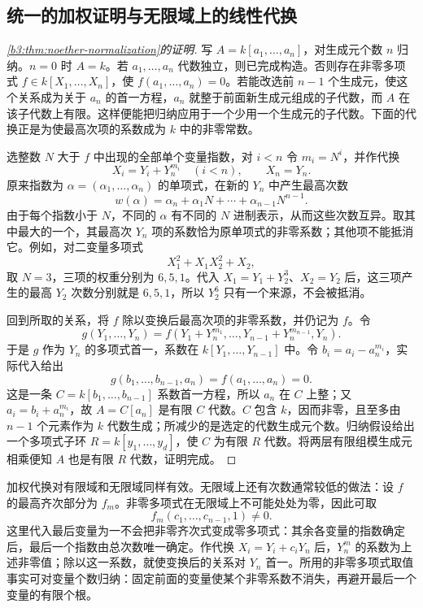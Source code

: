 \subsection{统一的加权证明与无限域上的线性代换}\label{b3:subsec:0504:02}

\begin{proof}[\cref{b3:thm:noether-normalization}的证明]
	写 \(A=k[a_1,\ldots,a_n]\)，对生成元个数 \(n\) 归纳。\(n=0\) 时 \(A=k\)。若 \(a_1,\ldots,a_n\) 代数独立，则已完成构造。否则存在非零多项式 \(f\in k[X_1,\ldots,X_n]\)，使 \(f(a_1,\ldots,a_n)=0\)。若能改选前 \(n-1\) 个生成元，使这个关系成为关于 \(a_n\) 的首一方程，\(a_n\) 就整于前面新生成元组成的子代数，而 \(A\) 在该子代数上有限。这样便能把归纳应用于一个少用一个生成元的子代数。下面的代换正是为使最高次项的系数成为 \(k\) 中的非零常数。

	选整数 \(N\) 大于 \(f\) 中出现的全部单个变量指数，对 \(i<n\) 令 \(m_i=N^i\)，并作代换
	\[
		X_i=Y_i+Y_n^{m_i}\quad(i<n),\qquad X_n=Y_n.
	\]
	原来指数为 \(\alpha=(\alpha_1,\ldots,\alpha_n)\) 的单项式，在新的 \(Y_n\) 中产生最高次数
	\[
		w(\alpha)=\alpha_n+\alpha_1N+\cdots+\alpha_{n-1}N^{n-1}.
	\]
	由于每个指数小于 \(N\)，不同的 \(\alpha\) 有不同的 \(N\) 进制表示，从而这些次数互异。取其中最大的一个，其最高次 \(Y_n\) 项的系数恰为原单项式的非零系数；其他项不能抵消它。例如，对二变量多项式
	\[
		X_1^2+X_1X_2^2+X_2,
	\]
	取 \(N=3\)，三项的权重分别为 \(6,5,1\)。代入 \(X_1=Y_1+Y_2^3\)、\(X_2=Y_2\) 后，这三项产生的最高 \(Y_2\) 次数分别就是 \(6,5,1\)，所以 \(Y_2^6\) 只有一个来源，不会被抵消。

	回到所取的关系，将 \(f\) 除以变换后最高次项的非零系数，并仍记为 \(f\)。令
	\[
		g(Y_1,\ldots,Y_n) =f(Y_1+Y_n^{m_1},\ldots,Y_{n-1}+Y_n^{m_{n-1}},Y_n).
	\]
	于是 \(g\) 作为 \(Y_n\) 的多项式首一，系数在 \(k[Y_1,\ldots,Y_{n-1}]\) 中。令 \(b_i=a_i-a_n^{m_i}\)，实际代入给出
	\[
		g(b_1,\ldots,b_{n-1},a_n)=f(a_1,\ldots,a_n)=0.
	\]
	这是一条 \(C=k[b_1,\ldots,b_{n-1}]\) 系数首一方程，所以 \(a_n\) 在 \(C\) 上整；又 \(a_i=b_i+a_n^{m_i}\)，故 \(A=C[a_n]\) 是有限 \(C\) 代数。\(C\) 包含 \(k\)，因而非零，且至多由 \(n-1\) 个元素作为 \(k\) 代数生成；所减少的是选定的代数生成元个数。归纳假设给出一个多项式子环 \(R=k[y_1,\ldots,y_d]\)，使 \(C\) 为有限 \(R\) 代数。将两层有限组模生成元相乘便知 \(A\) 也是有限 \(R\) 代数，证明完成。
\end{proof}

加权代换对有限域和无限域同样有效。无限域上还有次数通常较低的做法：设 \(f\) 的最高齐次部分为 \(f_m\)。非零多项式在无限域上不可能处处为零，因此可取
\[
	f_m(c_1,\ldots,c_{n-1},1)\ne0.
\]
这里代入最后变量为一不会把非零齐次式变成零多项式：其余各变量的指数确定后，最后一个指数由总次数唯一确定。作代换 \(X_i=Y_i+c_iY_n\) 后，\(Y_n^m\) 的系数为上述非零值；除以这一系数，就使变换后的关系对 \(Y_n\) 首一。所用的非零多项式取值事实可对变量个数归纳：固定前面的变量使某个非零系数不消失，再避开最后一个变量的有限个根。

